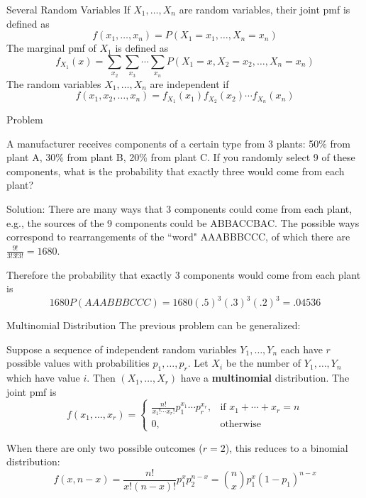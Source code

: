 \documentclass[xcolor=table]{beamer}
\renewcommand{\emph}{\textbf}
\begin{document}
\begin{frame}{Several Random Variables}
If $X_1, \dots, X_n$ are random variables, their joint pmf is defined as
$$f(x_1,\dots,x_n) =P(X_1=x_1, \dots, X_n=x_n)$$
\pause The marginal pmf of $X_1$ is defined as
$$f_{X_1}(x)= \sum_{x_2}\sum_{x_3}\cdots\sum_{x_n} P(X_1=x, X_2=x_2,\dots,X_n=x_n)$$
\pause The random variables $X_1,\dots,X_n$ are independent if
$$f(x_1,x_2,\dots,x_n) = f_{X_1}(x_1)f_{X_2}(x_2)\cdots f_{X_n}(x_n)$$
\end{frame}

\begin{frame}{Problem}
\begin{block}{}
A manufacturer receives components of a certain type from 3 plants: 50\% from plant A, 30\% from plant B, 20\% from plant C. If you randomly select 9 of these components, what is the probability that exactly three would come from each plant?
\end{block}

\pause Solution: There are many ways that 3 components could come from each plant, e.g., the sources of the 9 components could be ABBACCBAC. The possible ways correspond to  rearrangements of the ``word" AAABBBCCC, of which there are $\frac{9!}{3!3!3!}=1680$.

\vspace{.2cm}
\pause Therefore the probability that exactly 3 components would come from each plant is
$$1680P(AAABBBCCC) = 1680(.5)^3(.3)^3(.2)^3 =  .04536$$
\end{frame}

\begin{frame}{Multinomial Distribution}
The previous problem can be generalized:
\begin{block}{}
Suppose a sequence of independent random variables $Y_1,\dots,Y_n$ each have $r$ possible values with probabilities $p_1,\dots,p_r$. Let $X_i$ be the number of $Y_1,\dots,Y_n$ which have value $i$. Then $(X_1,\dots,X_r)$ have a \emph{multinomial} distribution. The joint pmf is
$$f(x_1,\dots,x_r) = \begin{cases}\frac{n!}{x_1!\cdots x_r!}p_1^{x_1}\cdots p_r^{x_r}, & \text{if }x_1+\cdots+x_r=n \\ 0, & \text{otherwise}\end{cases}$$
\end{block}
\pause When there are only two possible outcomes ($r=2$), this reduces to a binomial distribution:
$$f(x,n-x) = \frac{n!}{x!(n-x)!}p_1^xp_2^{n-x} = \binom n x p_1^x(1-p_1)^{n-x}$$
\end{frame}
\end{document}
